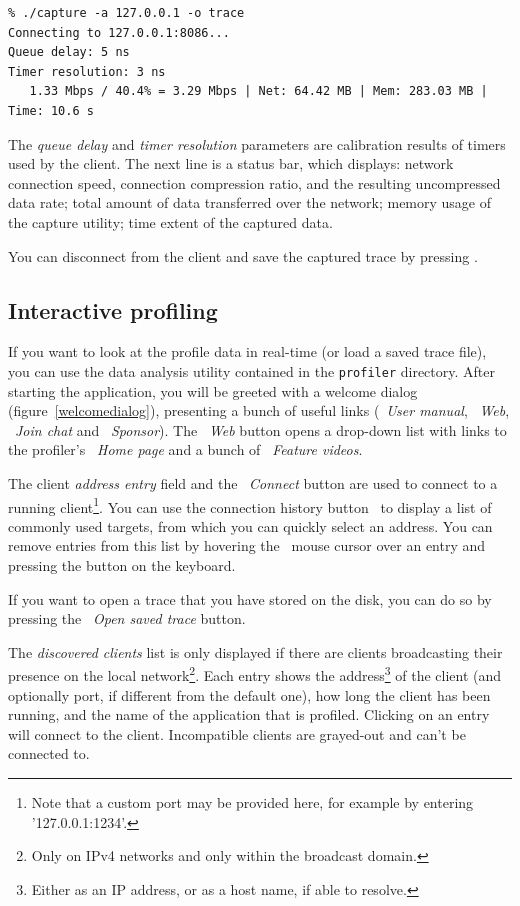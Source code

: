 \documentclass[hidelinks,titlepage,a4paper]{article}
\begin{document}
\begin{verbatim}
% ./capture -a 127.0.0.1 -o trace
Connecting to 127.0.0.1:8086...
Queue delay: 5 ns
Timer resolution: 3 ns
   1.33 Mbps / 40.4% = 3.29 Mbps | Net: 64.42 MB | Mem: 283.03 MB | Time: 10.6 s
\end{verbatim}

The \emph{queue delay} and \emph{timer resolution} parameters are calibration results of timers used by the client. The next line is a status bar, which displays: network connection speed, connection compression ratio, and the resulting uncompressed data rate; total amount of data transferred over the network; memory usage of the capture utility; time extent of the captured data.

You can disconnect from the client and save the captured trace by pressing .

\subsection{Interactive profiling}
\label{interactiveprofiling}

If you want to look at the profile data in real-time (or load a saved trace file), you can use the data analysis utility contained in the \texttt{profiler} directory. After starting the application, you will be greeted with a welcome dialog (figure~\ref{welcomedialog}), presenting a bunch of useful links (\faBook{}~\emph{User manual}, \faGlobeAmericas{}~\emph{Web}, \faComment~\emph{Join chat} and \faHeart{}~\emph{Sponsor}). The \faGlobeAmericas{}~\emph{Web} button opens a drop-down list with links to the profiler's \emph{\faHome{}~Home page} and a bunch of \emph{\faVideo{}~Feature videos}.

The client \emph{address entry} field and the \faWifi{}~\emph{Connect} button are used to connect to a running client\footnote{Note that a custom port may be provided here, for example by entering '127.0.0.1:1234'.}. You can use the connection history button~\faCaretDown{} to display a list of commonly used targets, from which you can quickly select an address. You can remove entries from this list by hovering the \faMousePointer{}~mouse cursor over an entry and pressing the \keys{\del} button on the keyboard.

If you want to open a trace that you have stored on the disk, you can do so by pressing the \faFolderOpen{}~\emph{Open saved trace} button.

The \emph{discovered clients} list is only displayed if there are clients broadcasting their presence on the local network\footnote{Only on IPv4 networks and only within the broadcast domain.}. Each entry shows the address\footnote{Either as an IP address, or as a host name, if able to resolve.} of the client (and optionally port, if different from the default one), how long the client has been running, and the name of the application that is profiled. Clicking on an entry will connect to the client. Incompatible clients are grayed-out and can't be connected to.
\end{document}
